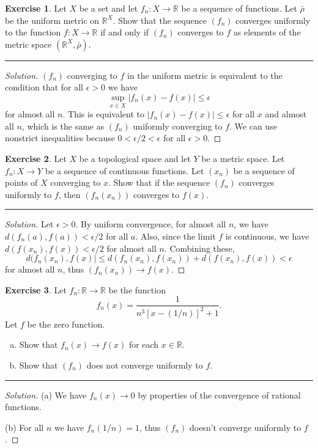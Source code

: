 \documentclass{article}
\theoremstyle{definition}
\newtheorem{exercise}{Exercise}[section]
\begin{document}
\pagebreak

\begin{exercise}
  Let $X$ be a set and let $f_n:X\to\mathbb{R}$ be a sequence of functions. Let $\bar{\rho}$ be the uniform metric on $\mathbb{R}^X$. Show that the sequence $(f_n)$ converges uniformly to the function $f:X\to\mathbb{R}$ if and only if $(f_n)$ converges to $f$ as elements of the metric space $(\mathbb{R}^X,\bar{\rho})$.
\end{exercise}
\hrule
\begin{proof}[Solution]
  $(f_n)$ converging to $f$ in the uniform metric is equivalent to the condition that for all $\epsilon > 0$ we have
  $$\sup_{x\in X}|f_n(x) - f(x)| \le \epsilon$$
  for almost all $n$. This is equivalent to $|f_n(x) - f(x)| \le \epsilon$ for all $x$ and almost all $n$, which is the same as $(f_n)$ uniformly converging to $f$. We can use nonstrict inequalities because $0 < \epsilon/2 < \epsilon$ for all $\epsilon > 0$.
\end{proof}

\pagebreak

\begin{exercise}
  Let $X$ be a topological space and let $Y$ be a metric space. Let $f_n:X\to Y$ be a sequence of continuous functions. Let $(x_n)$ be a sequence of points of $X$ converging to $x$. Show that if the sequence $(f_n)$ converges uniformly to $f$, then $(f_n(x_n))$ converges to $f(x)$.
\end{exercise}
\hrule
\begin{proof}[Solution]
  Let $\epsilon > 0$. By uniform convergence, for almost all $n$, we have \\ $d(f_n(a), f(a)) < \epsilon/2$ for all $a$. 
  Also, since the limit $f$ is continuous, we have $d(f(x_n), f(x)) < \epsilon / 2$ for almost all $n$. Combining these,
  $$d(f_n(x_n), f(x)| \le d(f_n(x_n), f(x_n)) + d(f(x_n), f(x)) < \epsilon$$
  for almost all $n$, thus $(f_n(x_n))\to f(x)$.
\end{proof}

\pagebreak

\begin{exercise}
  Let $f_n:\mathbb{R}\to\mathbb{R}$ be the function
  $$f_n(x) = \frac{1}{n^3[x-(1/n)]^2 + 1}.$$
  Let $f$ be the zero function.
  \begin{enumerate}[(a)]
    \item Show that $f_n(x)\to f(x)$ for each $x\in\mathbb{R}$.
    \item Show that $(f_n)$ does not converge uniformly to $f$.
  \end{enumerate}
\end{exercise}
\hrule
\begin{proof}[Solution]
  (a) We have $f_n(x)\to 0$ by properties of the convergence of rational functions.

  (b) For all $n$ we have $f_n(1/n) = 1$, thus $(f_n)$ doesn't converge uniformly to $f$.
\end{proof}
\end{document}
